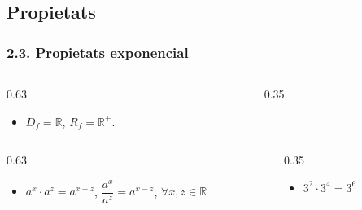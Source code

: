 \documentclass[aspectratio=169]{beamer}
\begin{document}
\subsection{Propietats}

\begin{frame}[t]
  \frametitle{2.3. Propietats exponencial}

  \small
  \setlength{\itemsep}{0pt}
  \setlength{\topsep}{0.08em}
  \setlength{\parsep}{0pt}

  \begin{columns}[T,onlytextwidth]
    \begin{column}{0.63\textwidth}
      \begin{minipage}[t][1.55em]{\columnwidth}
        \begin{itemize}
          \item<1-> \(D_f=\mathbb{R}\), \(R_f=\mathbb{R}^+\).
        \end{itemize}
      \end{minipage}
    \end{column}
    \begin{column}{0.35\textwidth}
      \begin{minipage}[t][1.55em]{\columnwidth}{\strut}\end{minipage}
    \end{column}
  \end{columns}

  \vspace{0.14cm}
  \begin{columns}[T,onlytextwidth]
    \begin{column}{0.63\textwidth}
      \begin{minipage}[t][4.1em]{\columnwidth}
        \begin{itemize}
          \item<2-> \(a^x\cdot a^z=a^{x+z}\), \quad \(\dfrac{a^x}{a^z}=a^{x-z}\), \quad \(\forall x,z\in\mathbb{R}\)
        \end{itemize}
      \end{minipage}
    \end{column}
    \begin{column}{0.35\textwidth}
      \begin{minipage}[c][4.1em]{\columnwidth}
        \begin{itemize}
          \item<3-> \(3^2\cdot 3^4=3^6\)
        \end{itemize}
      \end{minipage}
    \end{column}
  \end{columns}


\end{frame}
\end{document}
